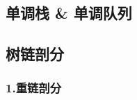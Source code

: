 \documentclass[
]{article}
\begin{document}
\hypertarget{ux5355ux8c03ux6808-ux5355ux8c03ux961fux5217}{%
\subsection{单调栈 \&
单调队列}\label{ux5355ux8c03ux6808-ux5355ux8c03ux961fux5217}}

\hypertarget{ux6811ux94feux5256ux5206}{%
\subsection{树链剖分}\label{ux6811ux94feux5256ux5206}}

\hypertarget{ux91cdux94feux5256ux5206}{%
\subsubsection{1.重链剖分}\label{ux91cdux94feux5256ux5206}}
\end{document}

